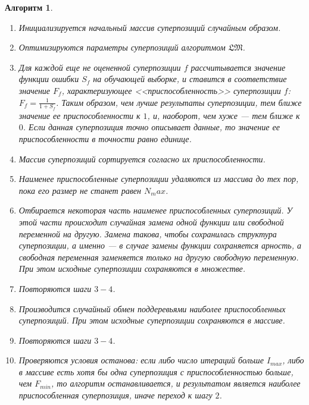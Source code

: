 \documentclass[12pt,a4paper]{amsart}
\newtheorem{algo}{Алгоритм}
\begin{document}
\begin{algo}
  \begin{enumerate}
	\item Инициализируется начальный массив суперпозиций случайным образом.
	\item Оптимизируются параметры суперпозиций алгоритмом $\mathfrak{LM}$.
	\item Для каждой еще не оцененной суперпозиции $f$ рассчитывается значение
	  функции ошибки $S_f$ на обучающей выборке, и ставится в соответствие
	  значение $F_f$, характеризующее <<приспособленность>> суперпозиции $f$:
	  $F_f = \frac{1}{1 + S_f}$. Таким образом, чем лучше результаты суперпозиции,
	  тем ближе значение ее приспособленности к $1$, и, наоборот, чем хуже ---
	  тем ближе к $0$. Если данная суперпозиция точно описывает данные, то
	  значение ее приспособленности в точности равно единице.
	\item Массив суперпозиций сортируется согласно их приспособленности.
	\item Наименее приспособленные суперпозиции удаляются из массива до тех
	  пор, пока его размер не станет равен $N_max$.
	\item Отбирается некоторая часть наименее приспособленных суперпозиций.
	  У этой части происходит случайная замена одной функции или свободной
	  переменной на другую. Замена такова, чтобы сохранилась структура
	  суперпозиции, а именно --- в случае замены функции сохраняется арность,
	  а свободная переменная заменяется только на другую свободную переменную.
	  При этом исходные суперпозиции сохраняются в множестве.
	\item Повторяются шаги $3-4$.
	\item Производится случайный обмен поддеревьями наиболее приспособленных
	  суперпозиций. При этом исходные суперпозиции сохраняются в массиве.
	\item Повторяются шаги $3-4$.
	\item Проверяются условия останова: если либо число итераций больше
	  $I_{max}$, либо в массиве есть хотя бы одна суперпозиция с
	  приспособленностью больше, чем $F_{min}$, то алгоритм останавливается,
	  и результатом является наиболее приспособленная суперпозиция, иначе
	  переход к шагу $2$.
  \end{enumerate}
\end{algo}


\extrasrussian

\end{document}
